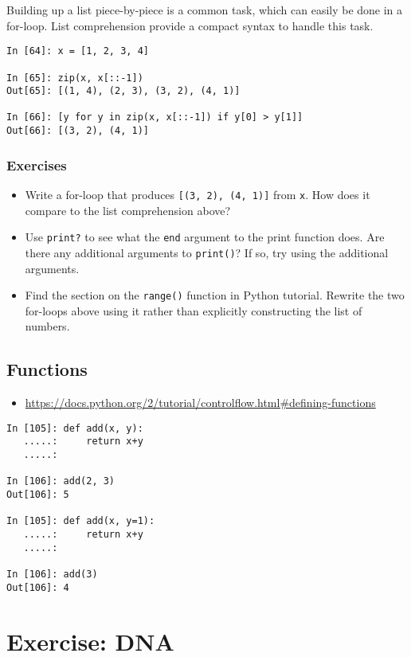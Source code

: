 Building up a list piece-by-piece is a common task, which can easily be
done in a for-loop.  List comprehension provide a compact syntax to
handle this task.

\begin{verbatim}
In [64]: x = [1, 2, 3, 4]

In [65]: zip(x, x[::-1])
Out[65]: [(1, 4), (2, 3), (3, 2), (4, 1)]

In [66]: [y for y in zip(x, x[::-1]) if y[0] > y[1]]
Out[66]: [(3, 2), (4, 1)]
\end{verbatim}
\subsubsection{Exercises}
\begin{itemize}
\item Write a for-loop that produces \texttt{[(3, 2), (4, 1)]} from \texttt{x}.
  How does it compare to the list comprehension above?
\item Use \texttt{print?} to see what the \texttt{end} argument to the print
  function does.  Are there any additional arguments to \texttt{print()}?
  If so, try using the additional arguments.
\item Find the section on the \texttt{range()} function in Python tutorial.
  Rewrite the two for-loops above using it rather than explicitly constructing
  the list of numbers.
\end{itemize}

\subsection{Functions}
\begin{itemize}
\item \url{https://docs.python.org/2/tutorial/controlflow.html#defining-functions}
\end{itemize}

\begin{verbatim}
In [105]: def add(x, y):
   .....:     return x+y
   .....: 

In [106]: add(2, 3)
Out[106]: 5

In [105]: def add(x, y=1):
   .....:     return x+y
   .....:

In [106]: add(3)
Out[106]: 4
\end{verbatim}

\section{Exercise: DNA}

